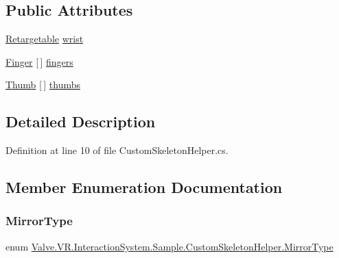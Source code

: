 \subsection*{Public Attributes}
\begin{DoxyCompactItemize}
\item 
\mbox{\hyperlink{class_valve_1_1_v_r_1_1_interaction_system_1_1_sample_1_1_custom_skeleton_helper_1_1_retargetable}{Retargetable}} \mbox{\hyperlink{class_valve_1_1_v_r_1_1_interaction_system_1_1_sample_1_1_custom_skeleton_helper_a80f1eaf8cda277ec8068e43ddc306916}{wrist}}
\item 
\mbox{\hyperlink{class_valve_1_1_v_r_1_1_interaction_system_1_1_sample_1_1_custom_skeleton_helper_1_1_finger}{Finger}} \mbox{[}$\,$\mbox{]} \mbox{\hyperlink{class_valve_1_1_v_r_1_1_interaction_system_1_1_sample_1_1_custom_skeleton_helper_a102850f1692d13f9aa30745da3f78a7f}{fingers}}
\item 
\mbox{\hyperlink{class_valve_1_1_v_r_1_1_interaction_system_1_1_sample_1_1_custom_skeleton_helper_1_1_thumb}{Thumb}} \mbox{[}$\,$\mbox{]} \mbox{\hyperlink{class_valve_1_1_v_r_1_1_interaction_system_1_1_sample_1_1_custom_skeleton_helper_a8050efc95ae47ac8972d5b84168b7e5e}{thumbs}}
\end{DoxyCompactItemize}


\subsection{Detailed Description}


Definition at line 10 of file Custom\+Skeleton\+Helper.\+cs.



\subsection{Member Enumeration Documentation}
\mbox{\label{class_valve_1_1_v_r_1_1_interaction_system_1_1_sample_1_1_custom_skeleton_helper_a19cf1f7c548cb676ab5ab16297b53e63}} 
\subsubsection{\texorpdfstring{MirrorType}{MirrorType}}
{\footnotesize\ttfamily enum \mbox{\hyperlink{class_valve_1_1_v_r_1_1_interaction_system_1_1_sample_1_1_custom_skeleton_helper_a19cf1f7c548cb676ab5ab16297b53e63}{Valve.\+V\+R.\+Interaction\+System.\+Sample.\+Custom\+Skeleton\+Helper.\+Mirror\+Type}}\hspace{0.3cm}{\ttfamily [strong]}}

